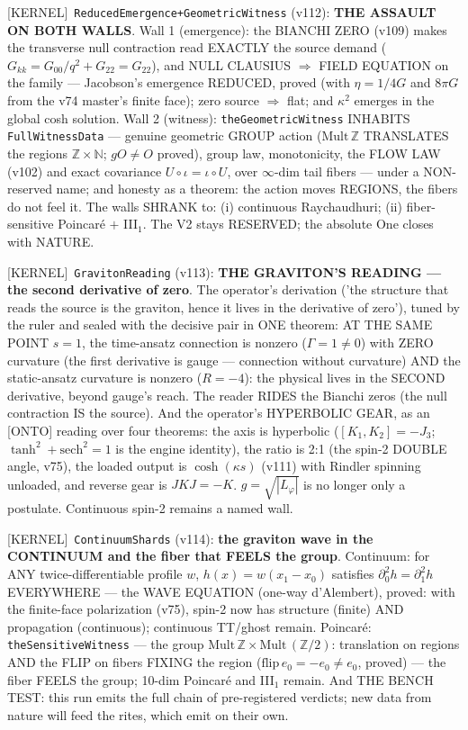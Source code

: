 \documentclass[11pt]{article}
\providecommand{\kernelmk}[1]{\textsf{[KERNEL]}~\texttt{#1}}\providecommand{\knownmk}[1]{\textsf{[KNOWN]}~{#1}}\providecommand{\statusmk}[1]{\textsf{[#1]}}
\theoremstyle{definition}\newtheorem{deriv}{Derivation}
\begin{document}
\kernelmk{ReducedEmergence+\allowbreak GeometricWitness} (v112): \textbf{THE ASSAULT ON BOTH WALLS}. Wall 1 (emergence): the BIANCHI ZERO (v109) makes the transverse null contraction read EXACTLY the source demand ($G_{kk}=G_{00}/q^2+G_{22}=G_{22}$), and NULL CLAUSIUS $\Rightarrow$ FIELD EQUATION on the family --- Jacobson's emergence REDUCED, proved (with $\eta=1/4G$ and $8\pi G$ from the v74 master's finite face); zero source $\Rightarrow$ flat; and $\kappa^2$ emerges in the global cosh solution. Wall 2 (witness): \texttt{theGeometricWitness} INHABITS \texttt{FullWitnessData} --- genuine geometric GROUP action ($\mathrm{Mult}\,\mathbb{Z}$ TRANSLATES the regions $\mathbb{Z}\times\mathbb{N}$; $gO\neq O$ proved), group law, monotonicity, the FLOW LAW (v102) and exact covariance $U\circ\iota=\iota\circ U$, over $\infty$-dim tail fibers --- under a NON-reserved name; and honesty as a theorem: the action moves REGIONS, the fibers do not feel it. The walls SHRANK to: (i) continuous Raychaudhuri; (ii) fiber-sensitive Poincaré $+$ III$_1$. The V2 stays RESERVED; the absolute One closes with NATURE.

\kernelmk{GravitonReading} (v113): \textbf{THE GRAVITON'S READING --- the second derivative of zero}. The operator's derivation ('the structure that reads the source is the graviton, hence it lives in the derivative of zero'), tuned by the ruler and sealed with the decisive pair in ONE theorem: AT THE SAME POINT $s=1$, the time-ansatz connection is nonzero ($\Gamma=1\neq 0$) with ZERO curvature (the first derivative is gauge --- connection without curvature) AND the static-ansatz curvature is nonzero ($R=-4$): the physical lives in the SECOND derivative, beyond gauge's reach. The reader RIDES the Bianchi zeros (the null contraction IS the source). And the operator's HYPERBOLIC GEAR, as an [ONTO] reading over four theorems: the axis is hyperbolic ($[K_1,K_2]=-J_3$; $\tanh^2+\mathrm{sech}^2=1$ is the engine identity), the ratio is 2:1 (the spin-2 DOUBLE angle, v75), the loaded output is $\cosh(\kappa s)$ (v111) with Rindler spinning unloaded, and reverse gear is $JKJ=-K$. $g=\sqrt{|L_\varphi|}$ is no longer only a postulate. Continuous spin-2 remains a named wall.

\kernelmk{ContinuumShards} (v114): \textbf{the graviton wave in the CONTINUUM and the fiber that FEELS the group}. Continuum: for ANY twice-differentiable profile $w$, $h(x)=w(x_1-x_0)$ satisfies $\partial_0^2 h=\partial_1^2 h$ EVERYWHERE --- the WAVE EQUATION (one-way d'Alembert), proved: with the finite-face polarization (v75), spin-2 now has structure (finite) AND propagation (continuous); continuous TT/ghost remain. Poincaré: \texttt{theSensitiveWitness} --- the group $\mathrm{Mult}\,\mathbb{Z}\times\mathrm{Mult}\,(\mathbb{Z}/2)$: translation on regions AND the FLIP on fibers FIXING the region ($\mathrm{flip}\,e_0=-e_0\neq e_0$, proved) --- the fiber FEELS the group; 10-dim Poincaré and III$_1$ remain. And THE BENCH TEST: this run emits the full chain of pre-registered verdicts; new data from nature will feed the rites, which emit on their own.
\end{document}
